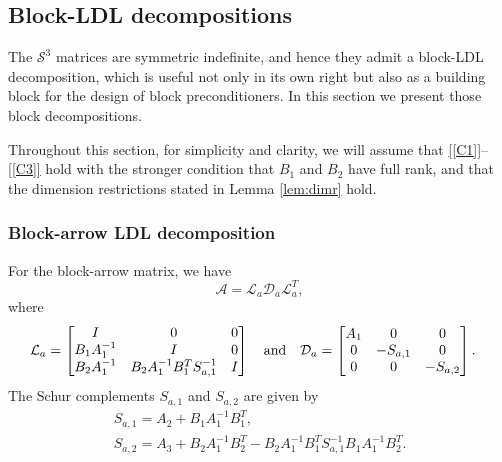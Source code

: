 \documentclass{article}
\newcommand{\st}{\mathcal{S}^3}
\newcommand{\sA}{\mathcal{A}}
\newcommand{\sD}{\mathcal{D}}
\newcommand{\sL}{\mathcal{L}}
\begin{document}
\subsection{Block-LDL decompositions} 
\label{sec:blockLDL}
The $\st$ matrices are symmetric indefinite, and hence they admit a block-LDL decomposition, which is useful not only in its own right but also as a building block for the design of block preconditioners. In this section we present those block decompositions.

Throughout this section, for simplicity and clarity, we will assume that  \ref{[C1]}--\ref{[C3]} hold with the stronger condition that $B_1$ and $B_2$ have full rank, and that the dimension restrictions stated in Lemma \ref{lem:dimr} hold.


\subsubsection{Block-arrow LDL decomposition}
\label{sec:block-arrow-ldl}
For the block-arrow matrix, we have
\[
\sA = \sL_a \sD_a \sL_a^T, 
\]
where
\begin{align}
\label{eq:arrow_ldl}
        \sL_a &=
		\begin{bmatrix}
			I & 0 & 0 \\
B_1 A_1^{-1} & I & 0 \\
B_2 A_1^{-1} & B_2 A_1^{-1} B_1^T S_{a,1}^{-1} & I
		\end{bmatrix} \quad {\rm and} \quad \sD_a = \begin{bmatrix}
				A_1 & 0 & 0 \\
				0 & -S_{a,1} & 0 \\
				0 & 0 & -S_{a,2}
		\end{bmatrix}.
\end{align}
The Schur complements $S_{a,1}$ and $S_{a,2}$ are given by
\begin{subequations}
    \label{eq:SCa}
    \begin{gather}
S_{a,1} = A_2 + B_1 A_1^{-1} B_1^T, 
\label{eq:sca1} \\
S_{a,2} = A_3 + B_2 A_1^{-1} B_2^T - B_2 A_1^{-1} B_1^T S_{a,1}^{-1} B_1 A_1^{-1} B_2^T.
 \label{eq:sca2}
\end{gather}
\end{subequations}
\end{document}
